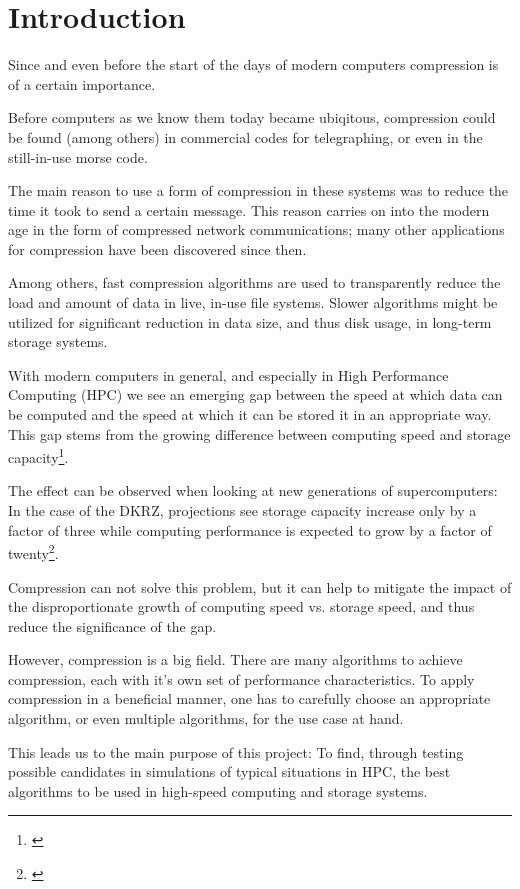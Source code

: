 \documentclass[
	12pt,
	a4paper,
	BCOR10mm,
	DIV14,
	listof=totoc,
	bibliography=totoc,
	headsepline
]{scrreprt}
\newcommand*{\mcite}[1]{\footnote{\cite{#1}}}
\begin{document}
\chapter{Introduction}
\label{Introduction}

Since and even before the start of the days of modern computers compression is of a certain importance.

Before computers as we know them today became ubiqitous, compression could be found (among others) in commercial codes for telegraphing, or even in the still-in-use morse code.

The main reason to use a form of compression in these systems was to reduce the time it took to send a certain message. This reason carries on into the modern age in the form of compressed network communications; many other applications for compression have been discovered since then.

Among others, fast compression algorithms are used to transparently reduce the load and amount of data in live, in-use file systems. Slower algorithms might be utilized for significant reduction in data size, and thus disk usage, in long-term storage systems.

With modern computers in general, and especially in High Performance Computing (HPC) we see an emerging gap between the speed at which data can be computed and the speed at which it can be stored it in an appropriate way. 
This gap stems from the growing difference between computing speed and storage capacity\mcite{ExaStoSy}.

The effect can be observed when looking at new generations of supercomputers: 
In the case of the DKRZ, projections see storage capacity increase only by a factor of three while computing performance is expected to grow by a factor of twenty\mcite{ExaStoSy}.

Compression can not solve this problem, but it can help to mitigate the impact of the disproportionate growth of computing speed vs. storage speed, and thus reduce the significance of the gap. 

However, compression is a big field. There are many algorithms to achieve compression, each with it's own set of performance characteristics. To apply compression in a beneficial manner, one has to carefully choose an appropriate algorithm, or even multiple algorithms, for the use case at hand.

This leads us to the main purpose of this project: To find, through testing possible candidates in simulations of typical situations in HPC, the best algorithms to be used in high-speed computing and storage systems.
\end{document}
